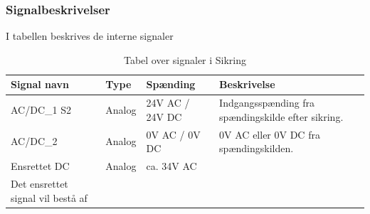 \subsubsection{Signalbeskrivelser}
I tabellen beskrives de interne signaler
\begin{table}[H]
\begin{tabular}{|p{3cm}|p{3cm}|p{3cm}|p{4.5cm}|} \hline
\cellcolor[gray]{0.85}Signal navn& \cellcolor[gray]{0.85}Type &\cellcolor[gray]{0.85}Spænding&\cellcolor[gray]{0.85}Beskrivelse\\ \hline
AC/DC\_1 S2 & Analog  & 24V AC / 24V DC & Indgangsspænding fra spændingskilde efter sikring.\\  \hline
AC/DC\_2  & Analog & 0V AC / 0V DC & 0V AC eller 0V DC fra spændingskilden. \\  \hline
Ensrettet DC & Analog & ca. 34V AC & \\ Det ensrettet signal vil bestå af  \hline
\end{tabular}
\caption{Tabel over signaler i Sikring}
\label{table:SikringSignaler}
\end{table}